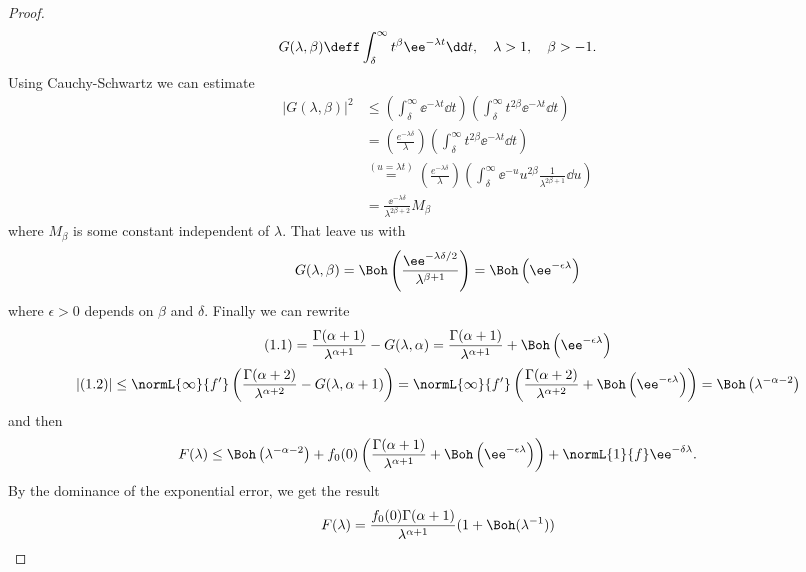 \begin{proof}
	\begin{equation}
		G(\lambda, \beta) \deff \int_{\delta}^{\infty} t^{\beta} \ee^{-\lambda t} \dd t, \ \ \ \lambda > 1, \quad \beta > -1. 
	\end{equation}
	Using Cauchy-Schwartz we can estimate
		\begin{align}
			|G(\lambda, \beta)|^2 & \leq \left( \int_{\delta}^{\infty} \ee^{-\lambda t} \dd t \right) \left(\int_{\delta}^{\infty} t^{2\beta} \ee^{-\lambda t} \dd t \right) \\
			& = \left(\frac{e^{-\lambda \delta}}{\lambda}\right) \left( \int_{\delta}^{\infty} t^{2\beta} \ee^{-\lambda t}\dd t \right)	\\
			& \stackrel{(u=\lambda t)}{=} \left(\frac{e^{-\lambda \delta}}{\lambda}\right) \left( \int_{\delta}^{\infty} \ee^{-u} u^{2\beta} \frac{1}{\lambda^{2\beta + 1}} \dd u \right) \\
			& = \frac{\ee^{-\lambda \delta}}{\lambda^{2\beta + 2}} M_\beta
		\end{align}
	where $M_\beta$ is some constant independent of $\lambda$. That leave us with
	\begin{equation}
		G(\lambda, \beta) = \Boh\left(\frac{\ee^{-\lambda\delta/2}}{\lambda^{\beta+1}}\right) = \Boh\left(\ee^{-\epsilon\lambda}\right)
	\end{equation}
	where $\epsilon > 0$ depends on $\beta$ and $\delta$. Finally we can rewrite
	\begin{equation}
		(1.1) = \frac{\Gamma(\alpha + 1)}{\lambda^{\alpha +1}} - G(\lambda, \alpha) =  \frac{\Gamma(\alpha + 1)}{\lambda^{\alpha+1}} + \Boh\left(\ee^{-\epsilon\lambda}\right)
	\end{equation}
	\begin{equation}
		|(1.2)| \leq \normL{\infty}{f'} \left( \frac{\Gamma(\alpha + 2)}{\lambda^{\alpha +2}} - G(\lambda, \alpha + 1) \right) =  \normL{\infty}{f'} \left( \frac{\Gamma(\alpha + 2)}{\lambda^{\alpha +2}} + \Boh\left(\ee^{-\epsilon\lambda}\right) \right) = \Boh\left(\lambda^{-\alpha-2}\right)
	\end{equation}
	and then
	\begin{equation}
		F(\lambda) \leq \Boh\left(\lambda^{-\alpha-2}\right) + f_0(0) \left( \frac{\Gamma(\alpha + 1)}{\lambda^{\alpha+1}} + \Boh\left(\ee^{-\epsilon\lambda}\right) \right) + \normL{1}{f} \ee^{-\delta \lambda}.
	\end{equation}
	By the dominance of the exponential error, we get the result
	\begin{equation}
		F(\lambda) = \frac{f_0(0) \Gamma(\alpha + 1)}{\lambda^{\alpha + 1}} (1 + \Boh(\lambda^{-1}))
	\end{equation}
\end{proof}

